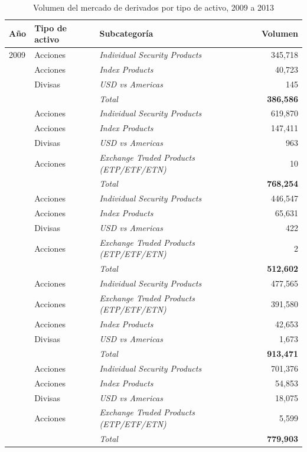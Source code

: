 \begin{table}[H]
\caption{Volumen del mercado de derivados por tipo de activo, 2009 a 2013}
\label{tab:derivados}
\small{}
\begin{tabular}{@{}llp{7.2cm}r@{}}
\toprule
Año & Tipo de activo & Subcategoría & Volumen \\
\midrule
2009 & Acciones & \textit{Individual Security Products} & 345,718 \\
 & Acciones & \textit{Index Products} & 40,723 \\
 & Divisas & \textit{USD vs Americas} & 145 \\
 & & \textit{Total} & \textbf{386,586} \\
\addlinespace[3pt]
2010 & Acciones & \textit{Individual Security Products} & 619,870 \\
 & Acciones & \textit{Index Products} & 147,411 \\
 & Divisas & \textit{USD vs Americas} & 963 \\
 & Acciones & \textit{Exchange Traded Products (ETP/ETF/ETN)} & 10 \\
 & & \textit{Total} & \textbf{768,254} \\
\addlinespace[3pt]
2011 & Acciones & \textit{Individual Security Products} & 446,547 \\
 & Acciones & \textit{Index Products} & 65,631 \\
 & Divisas & \textit{USD vs Americas} & 422 \\
 & Acciones & \textit{Exchange Traded Products (ETP/ETF/ETN)} & 2 \\
 & & \textit{Total} & \textbf{512,602} \\
\addlinespace[3pt]
2012 & Acciones & \textit{Individual Security Products} & 477,565 \\
 & Acciones & \textit{Exchange Traded Products (ETP/ETF/ETN)} & 391,580 \\
 & Acciones & \textit{Index Products} & 42,653 \\
 & Divisas & \textit{USD vs Americas} & 1,673 \\
 & & \textit{Total} & \textbf{913,471} \\
\addlinespace[3pt]
2013 & Acciones & \textit{Individual Security Products} & 701,376 \\
 & Acciones & \textit{Index Products} & 54,853 \\
 & Divisas & \textit{USD vs Americas} & 18,075 \\
 & Acciones & \textit{Exchange Traded Products (ETP/ETF/ETN)} & 5,599 \\
 & & \textit{Total} & \textbf{779,903} \\
\bottomrule
\end{tabular}
\end{table}


